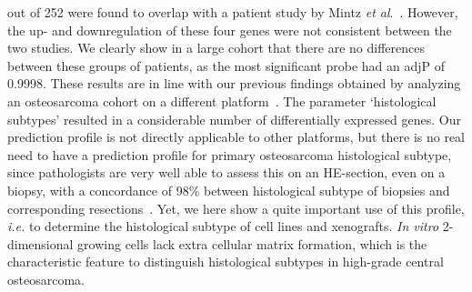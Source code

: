 out of 252 were found to overlap with a patient study
by Mintz {\it et al}.~\cite{mintz2005expression}. However, the up- and downregulation
of these four genes were not consistent between
the two studies. We clearly show in a large cohort that
there are no differences between these groups of
patients, as the most significant probe had an adjP of
0.9998. These results are in line with our previous findings
obtained by analyzing an osteosarcoma cohort on a
different platform~\cite{cleton2009profiling}. The parameter `histological subtypes'
resulted in a considerable number of differentially
expressed genes. Our prediction profile is not directly
applicable to other platforms, but there is no real need
to have a prediction profile for primary osteosarcoma
histological subtype, since pathologists are very well able
to assess this on an HE-section, even on a biopsy, with
a concordance of 98\% between histological subtype of
biopsies and corresponding resections~\cite{hauben2002does}. Yet, we here
show a quite important use of this profile, {\it i.e.} to determine
the histological subtype of cell lines and xenografts.
{\it In vitro} 2\hyp{}dimensional growing cells lack extra
cellular matrix formation, which is the characteristic feature
to distinguish histological subtypes in high\hyp{}grade
central osteosarcoma.

